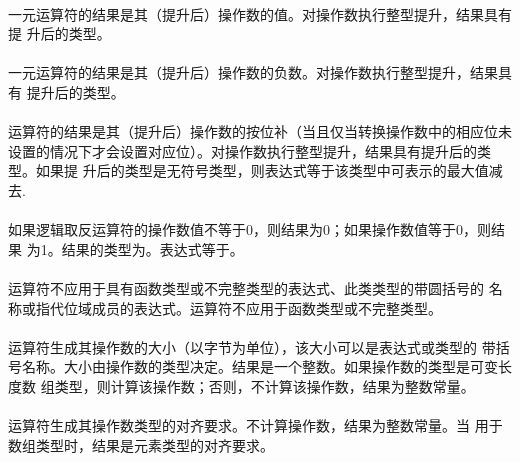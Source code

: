 \semantic
\paragraph{}
一元\tm{+}运算符的结果是其（提升后）操作数的值。对操作数执行整型提升，结果具有提
升后的类型。

\paragraph{}
一元\tm{-}运算符的结果是其（提升后）操作数的负数。对操作数执行整型提升，结果具有
提升后的类型。

\paragraph{}
\tm{\~}运算符的结果是其（提升后）操作数的按位补（当且仅当转换操作数中的相应位未
设置的情况下才会设置对应位）。对操作数执行整型提升，结果具有提升后的类型。如果提
升后的类型是无符号类型，则表达式等于该类型中可表示的最大值减去.

\paragraph{}
如果逻辑取反运算符\tm{!}的操作数值不等于0，则结果为0；如果操作数值等于0，则结果
为1。结果的类型为。表达式等于。

\constraint
\paragraph{}
运算符不应用于具有函数类型或不完整类型的表达式、此类类型的带圆括号的
名称或指代位域成员的表达式。运算符不应用于函数类型或不完整类型。

\semantic
\paragraph{}
运算符生成其操作数的大小（以字节为单位），该大小可以是表达式或类型的
带括号名称。大小由操作数的类型决定。结果是一个整数。如果操作数的类型是可变长度数
组类型，则计算该操作数；否则，不计算该操作数，结果为整数常量。

\paragraph{}
运算符生成其操作数类型的对齐要求。不计算操作数，结果为整数常量。当
用于数组类型时，结果是元素类型的对齐要求。

